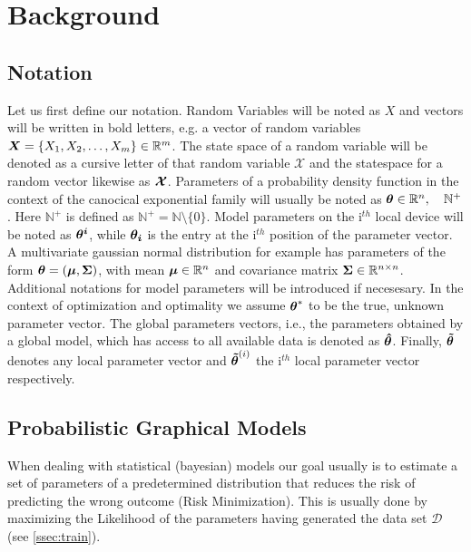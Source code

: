\chapter{Background}
\label{chapter:kap2}

\section{Notation}
\label{sec:nota}
Let us first define our notation. 
Random Variables will be noted as $X$ and vectors will be written in bold letters, e.g. a vector of random variables $\boldsymbol{X} = \{X_1, X_2, \ldots, X_m\} \in \mathbb{R}^m$.
The state space of a random variable will be denoted as a cursive letter of that random variable $\mathcal{X}$ and the statespace for  a random vector likewise as $\boldsymbol{\mathcal{X}}$.
Parameters of a probability density function in the context of the canocical exponential family will usually be noted as $\boldsymbol{\theta} \in \mathbb{R}^n, \quad \mathbb{N}^+$.
Here $\mathbb{N}^+$ is defined as $ \mathbb{N}^+ = \mathbb{N} \setminus \{0\}$.
Model parameters on the i$^{th}$ local device will be noted as $\boldsymbol{\theta^i}$, while $\boldsymbol{\theta_i}$ is the entry at the i$^{th}$ position of the parameter vector.
A multivariate gaussian normal distribution for example has parameters of the form $\boldsymbol{\theta} = (\boldsymbol{\mu}, \boldsymbol{\Sigma})$, with mean $\boldsymbol{\mu} \in \mathbb{R}^{n}$ and covariance matrix $\boldsymbol{\Sigma} \in \mathbb{R}^{n \times n}$.
Additional notations for model parameters will be introduced if necesesary.
In the context of optimization and optimality we assume $\boldsymbol{\theta}^*$ to be the true, unknown parameter vector.
The global parameters vectors, i.e., the parameters obtained by a global model, which has access to all available data is denoted as  $\boldsymbol{\hat{\theta}}$.
Finally, $\boldsymbol{\tilde{\theta}}$ denotes any local parameter vector and $\boldsymbol{\tilde{\theta}}^{(i)}$ the i$^{th}$ local parameter vector respectively.

\section{Probabilistic Graphical Models}
\label{sec:pgm}
When dealing with statistical (bayesian) models our goal usually is to estimate a set of parameters of a predetermined distribution that reduces the risk of predicting the wrong outcome (Risk Minimization). 
This is usually done by maximizing the Likelihood of the parameters having generated the data set $\mathcal{D}$ (see \ref{ssec:train}).

